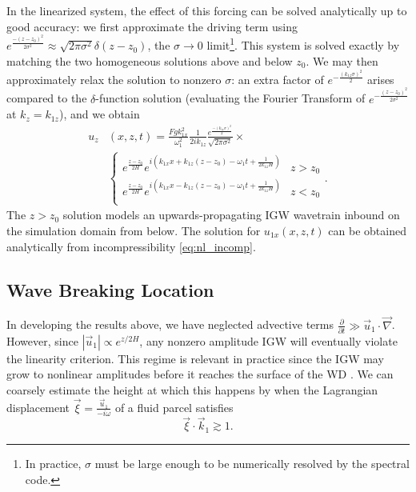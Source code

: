 \documentclass[
        fleqn,
        usenatbib,
    ]{mnras}
\newcommand*{\pd}[2]{\frac{\partial#1}{\partial#2}}
\newcommand*{\abs}[1]{\left|#1\right|}
\newcommand*{\p}[1]{\left(#1\right)}
\begin{document}
In the linearized system, the effect of this forcing can be solved analytically
up to good accuracy: we first approximate the driving term using
$e^{\frac{-(z - z_0)^2}{2\sigma^2}} \approx \sqrt{2\pi \sigma^2}\delta(z -
z_0)$, the $\sigma \to 0$ limit\footnote{In practice, $\sigma$ must be large
enough to be numerically resolved by the spectral code.}. This system is solved
exactly by matching the two homogeneous solutions above and below $z_0$. We may
then approximately relax the solution to nonzero $\sigma$: an extra factor of
$e^{-\frac{(k_{1z}\sigma)^2}{2}}$ arises compared to the $\delta$-function
solution (evaluating the Fourier Transform of $e^{-\frac{(z -
z_0)^2}{2\sigma^2}}$ at $k_z = k_{1z}$), and we obtain
\begin{align}
    u_{z}&(x, z, t) ={} \frac{Fgk_{1x}^2}{\omega_1^2}
        \frac{1}{2ik_{1z}}\frac{e^{\frac{-(k_{1z}\sigma)^2}{2}}}
        {\sqrt{2\pi\sigma^2}} \times\nonumber\\
        &{}\begin{cases}
        e^{\frac{z - z_0}{2H}}e^{i\p{k_{1x}x + k_{1z}(z - z_0) - \omega_1 t
            + \frac{1}{2k_{1z}H}}}
            & z > z_0\\
        e^{\frac{z - z_0}{2H}}e^{i\p{k_{1x}x - k_{1z}(z - z_0) - \omega_1 t
            + \frac{1}{2k_{1z}H}}}
            & z < z_0\\
    \end{cases}.\label{eq:uz_lin}
\end{align}
The $z > z_0$ solution models an upwards-propagating IGW wavetrain inbound on
the simulation domain from below. The solution for $u_{1x}(x, z, t)$ can be
obtained analytically from incompressibility \autoref{eq:nl_incomp}.

\subsection{Wave Breaking Location}\label{ss:wave_breaking}

In developing the results above, we have neglected advective terms $\pd{}{t} \gg
\vec{u}_1 \cdot \vec{\nabla}$. However, since $\abs{\vec{u}_1} \propto
e^{z/2H}$, any nonzero amplitude IGW will eventually violate the linearity
criterion. This regime is relevant in practice since the IGW may grow to
nonlinear amplitudes before it reaches the surface of the WD
\citep{fullerI,fullerII}. We can coarsely estimate the height at which this
happens by when the Lagrangian displacement $\vec{\xi} =
\frac{\vec{u}_1}{-i\omega}$ of a fluid parcel satisfies
\begin{equation}
    \vec{\xi} \cdot \vec{k}_1 \gtrsim 1.\label{eq:nl}
\end{equation}
\end{document}
